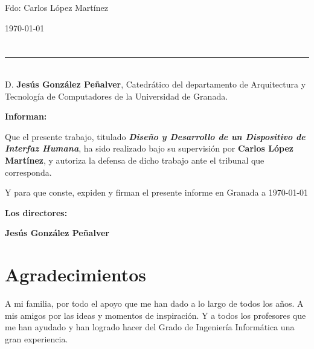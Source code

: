 \vspace{6cm}

\noindent Fdo: Carlos López Martínez

\vspace{2cm}

\begin{flushright}
\today
\end{flushright}


\chapter*{}
\thispagestyle{empty}

\noindent\rule[-1ex]{\textwidth}{2pt}\\[4.5ex]

D. \textbf{Jesús González Peñalver}, Catedrático del departamento de Arquitectura y Tecnología de Computadores de la Universidad de Granada.

\vspace{0.5cm}

\textbf{Informan:}

\vspace{0.5cm}

Que el presente trabajo, titulado \textit{\textbf{Diseño y Desarrollo de un Dispositivo de Interfaz Humana}},
ha sido realizado bajo su supervisión por \textbf{Carlos López Martínez}, y autoriza la defensa de dicho trabajo ante el tribunal
que corresponda.

\vspace{0.5cm}

Y para que conste, expiden y firman el presente informe en Granada a \today

\vspace{1cm}

\textbf{Los directores:}

\vspace{5cm}

\noindent \textbf{Jesús González Peñalver}

\chapter*{Agradecimientos}
\thispagestyle{empty}

       \vspace{1cm}

A mi familia, por todo el apoyo que me han dado a lo largo de todos
los años. A mis amigos por las ideas y momentos de inspiración. Y a
todos los profesores que me han ayudado y han logrado hacer del Grado de
Ingeniería Informática una gran experiencia.